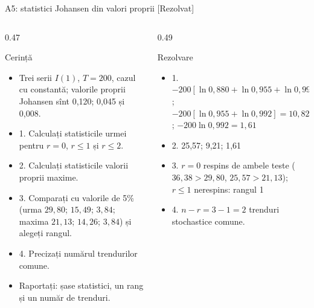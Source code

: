 \begin{frame}{A5: statistici Johansen din valori proprii [Rezolvat]}
\itemsize{\scriptsize}
\begin{columns}[T]
\begin{column}{0.47\textwidth}
\begin{block}{Cerință}
\begin{itemize}
    \item Trei serii $I(1)$, $T = 200$, cazul cu constantă; valorile proprii Johansen sînt 0,120; 0,045 și 0,008.
    \item 1. Calculați statisticile urmei pentru $r = 0$, $r \le 1$ și $r \le 2$.
    \item 2. Calculați statisticile valorii proprii maxime.
    \item 3. Comparați cu valorile de 5\% (urma $29{,}80$; $15{,}49$; $3{,}84$; maxima $21{,}13$; $14{,}26$; $3{,}84$) și alegeți rangul.
    \item 4. Precizați numărul trendurilor comune.
    \item Raportați: șase statistici, un rang și un număr de trenduri.
\end{itemize}
\end{block}
\end{column}
\begin{column}{0.49\textwidth}
\begin{exampleblock}{Rezolvare}
\begin{itemize}
    \item 1. $-200[\ln 0{,}880 + \ln 0{,}955 + \ln 0{,}992] = 36{,}38$; $-200[\ln 0{,}955 + \ln 0{,}992] = 10{,}82$; $-200\ln 0{,}992 = 1{,}61$
    \item 2. 25{,}57; 9{,}21; 1{,}61
    \item 3. $r = 0$ respins de ambele teste ($36{,}38 > 29{,}80$, $25{,}57 > 21{,}13$); $r \le 1$ nerespins: rangul 1
    \item 4. $n - r = 3 - 1 = 2$ trenduri stochastice comune.
\end{itemize}
\end{exampleblock}
\end{column}
\end{columns}
\end{frame}


